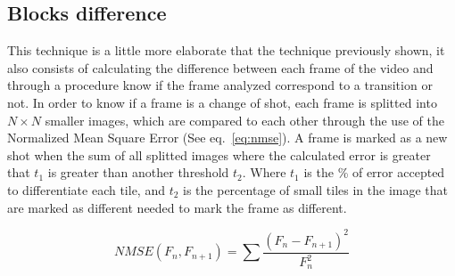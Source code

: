 \documentclass[journal]{IEEEtran}
\begin{document}
\subsection{Blocks difference}
This technique is a little more elaborate that the technique previously shown, it also consists of calculating the difference between each frame of the video and through a procedure know if the frame analyzed correspond to a transition or not. In order to know if a frame is a change of shot, each frame is splitted into $N\times N$ smaller images, which are compared to each other through the use of the Normalized Mean Square Error (See eq.~\ref{eq:nmse}). A frame is marked as a new shot when the sum of all splitted images where the calculated error is greater that $t_1$ is greater than another threshold $t_2$. Where $t_1$ is the \% of error accepted to differentiate each tile, and $t_2$ is the percentage of small tiles in the image that are marked as different needed to mark the frame as different.


\begin{equation}
\label{eq:nmse}
NMSE(F_{n}, F_{n+1}) = \sum \frac {(F_{n} - F_{n+1})^2}{F_{n}^2}
\end{equation}
\end{document}
